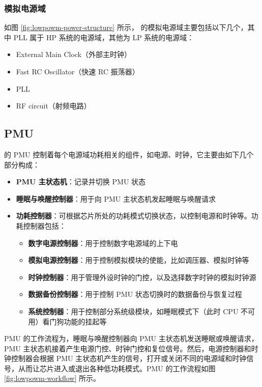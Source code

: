 \documentclass[main\_\_CN.tex]{subfiles}
\begin{document}
\subsubsection{模拟电源域}

如图 \ref{fig:lowpowm-power-structure} 所示，\chipname{} 的模拟电源域主要包括以下几个，其中 PLL 属于 HP 系统的电源域，其他为 LP 系统的电源域：

\begin{itemize}
    \item External Main Clock（外部主时钟）
    \item Fast RC Oscillator（快速 RC 振荡器）
    \item PLL
    \item RF circuit（射频电路）
\end{itemize}

\subsection{PMU}

\chipname{} 的 PMU 控制着每个电源域功耗相关的组件，如电源、时钟，它主要由如下几个部分构成：

\begin{itemize}
    \item \textbf{PMU 主状态机}：记录并切换 PMU 状态
    \item \textbf{睡眠与唤醒控制器}：用于向 PMU 主状态机发起睡眠与唤醒请求
    \item \textbf{功耗控制器}：可根据芯片所处的功耗模式切换状态，以控制电源和时钟等。功耗控制器包括：
        \begin{itemize}
            \item \textbf{数字电源控制器}：用于控制数字电源域的上下电
            \item \textbf{模拟电源控制器}：用于控制模拟模块的使能，比如调压器、模拟时钟等
            \item \textbf{时钟控制器}：用于管理外设时钟的门控，以及选择数字时钟的模拟时钟源
            \item \textbf{数据备份控制器}：用于控制 PMU 状态切换时的数据备份与恢复过程
            \item \textbf{系统控制器}：用于控制部分系统级模块，如睡眠模式下（此时 CPU 不可用）看门狗功能的挂起等
        \end{itemize}
\end{itemize}

PMU 的工作流程为，睡眠与唤醒控制器向 PMU 主状态机发送睡眠或唤醒请求，PMU 主状态机接着产生电源门控、时钟门控和复位信号。然后，电源控制器和时钟控制器会根据 PMU 主状态机产生的信号，打开或关闭不同的电源域和时钟信号，从而让芯片进入或退出各种低功耗模式。PMU 的工作流程如图 \ref{fig:lowpowm-workflow} 所示。
\end{document}
